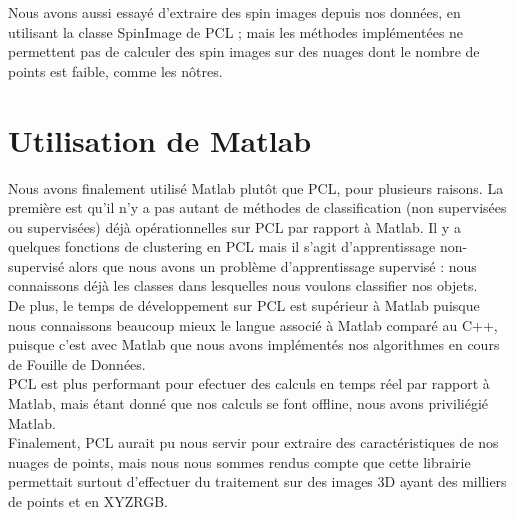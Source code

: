 	Nous avons aussi essayé d'extraire des spin images depuis nos données, en utilisant la classe SpinImage de PCL ; mais les méthodes implémentées ne permettent pas de calculer des spin images sur des nuages dont le nombre de points est faible, comme les nôtres.\\

\section{Utilisation de Matlab}

	Nous avons finalement utilisé Matlab plutôt que PCL, pour plusieurs raisons. La première est qu'il n'y a pas autant de méthodes de classification (non supervisées ou supervisées) déjà opérationnelles sur PCL par rapport à Matlab. Il y a quelques fonctions de clustering en PCL mais il s'agit d'apprentissage non-supervisé alors que nous avons un problème d'apprentissage supervisé : nous connaissons déjà les classes dans lesquelles nous voulons classifier nos objets.\\

	De plus, le temps de développement sur PCL est supérieur à Matlab puisque nous connaissons beaucoup mieux le langue associé à Matlab comparé au C++, puisque c'est avec Matlab que nous avons implémentés nos algorithmes en cours de Fouille de Données. \\

	PCL est plus performant pour efectuer des calculs en temps réel par rapport à Matlab, mais étant donné que nos calculs se font offline, nous avons priviliégié Matlab. \\

	Finalement, PCL aurait pu nous servir pour extraire des caractéristiques de nos nuages de points, mais nous nous sommes rendus compte que cette librairie permettait surtout d'effectuer du traitement sur des images 3D ayant des milliers de points et en XYZRGB.\\


